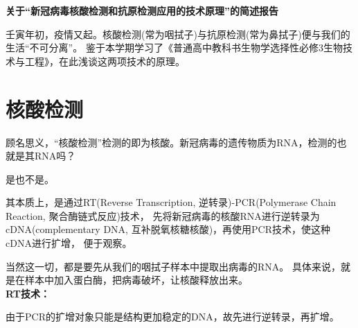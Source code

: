 \documentclass[UTF8,a4paper,11 pt]{ctexart}
\begin{document}
	\setlength{\lineskip}{8pt}
	\setlength{\lineskiplimit}{8pt}
	\pagestyle{fancy}
	\fancyhead[C]{} %
	\fancyfoot[C]{\thepage}
	\begin{center}
		\LARGE{\textbf{关于“新冠病毒核酸检测和抗原检测应用的技术原理”的简述报告}}
	\end{center}
	\mbox{\qquad}壬寅年初，疫情又起。核酸检测(常为咽拭子)与抗原检测(常为鼻拭子)便与我们的生活“不可分离”。
	鉴于本学期学习了《普通高中教科书\quad 生物学\quad 选择性必修3\quad 生物技术与工程》，在此浅谈这两项技术的原理。
	\part{核酸检测}
	顾名思义，“核酸检测”检测的即为核酸。新冠病毒的遗传物质为RNA，检测的也就是其RNA吗？

	是也不是。
	
	其本质上，是通过RT(Reverse Transcription, 逆转录)-PCR(Polymerase Chain Reaction, 聚合酶链式反应)技术，
	先将新冠病毒的核酸RNA进行逆转录为cDNA(complementary DNA, 互补脱氧核糖核酸)，再使用PCR技术，使这种cDNA进行扩增，
	便于观察。

	当然这一切，都是要先从我们的咽拭子样本中提取出病毒的RNA。
	具体来说，就是在样本中加入蛋白酶，把病毒破坏，让核酸释放出来。
	\\\textbf{RT技术：}

	由于PCR的扩增对象只能是结构更加稳定的DNA，故先进行逆转录，再扩增。
\end{document}

